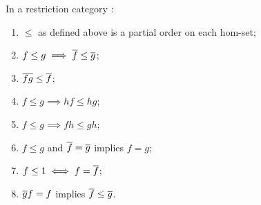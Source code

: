 \begin{lemma}\label{lem:restriction_cats_are_partial_order_enriched}
  In a restriction category \X:
  \begin{multicols}{2}
    \begin{enumerate}[{(}i{)}]
      \item  $\le$ as defined  above is a partial order on each hom-set;
      \item $f \le g \implies \overline{f} \le \overline{g}$;\label{lemitem:rst_ordering_2}
      \item $\overline{f g} \le \overline{f}$; \label{lemitem:rst_ordering_3}
      \item $f \le g \implies h f \le h g$;
      \item $f \le g \implies f h \le g h$;
      \item $f \le g$ and $\overline{f} = \overline{g}$ implies $f = g$;
      \item $f \le 1 \iff f = \overline{f}$;
      \item $\overline{g}f = f$ implies $\overline{f} \le \overline{g}$.
    \end{enumerate}
  \end{multicols}
\end{lemma}
